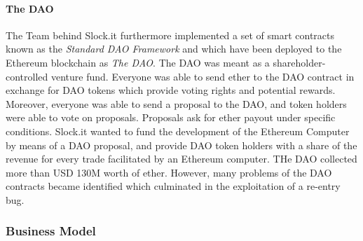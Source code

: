 \paragraph{The DAO}

The Team behind Slock.it furthermore implemented a set of smart contracts known as the \emph{Standard DAO Framework} and which have been deployed to the Ethereum blockchain as \emph{The DAO}. The DAO was meant as a shareholder-controlled venture fund. Everyone was able to send ether to the DAO contract in exchange for DAO tokens which provide voting rights and potential rewards. Moreover, everyone was able to send a proposal to the DAO, and token holders were able to vote on proposals. Proposals ask for ether payout under specific conditions. Slock.it wanted to fund the development of the Ethereum Computer by means of a DAO proposal, and provide DAO token holders with a share of the revenue for every trade facilitated by an Ethereum computer. THe DAO collected more than USD 130M worth of ether. However, many problems of the DAO contracts became identified which culminated in the exploitation of a re-entry bug.

\subsubsection{Business Model}






